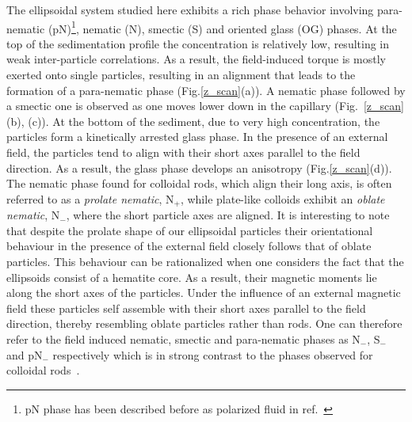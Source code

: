 \documentclass[aps,prl,preprint,superscriptaddress]{revtex4-1} %
\begin{document}
The ellipsoidal system studied here exhibits a rich phase behavior involving para-nematic (pN)\footnote{pN phase has been described before as polarized fluid in ref.~\cite{martchenko2016anisotropic}}, nematic (N), smectic (S) and oriented glass (OG) phases. At the top of the sedimentation profile the concentration is relatively low, resulting in weak inter-particle correlations. As a result, the field-induced torque is mostly exerted onto single particles, resulting in an alignment that leads to the formation of a para-nematic phase (Fig.\ref{z_scan}(a)). A nematic phase followed by a smectic one is observed as one moves lower down in the capillary (Fig.~\ref{z_scan}(b), (c)). At the bottom of the sediment, due to very high concentration, the particles form a kinetically arrested glass phase. In the presence of an external field, the particles tend to align with their short axes parallel to the field direction. As a result, the glass phase develops an anisotropy (Fig.\ref{z_scan}(d)). The nematic phase found for colloidal rods, which align their long axis, is often referred to as a \emph{prolate nematic}, N$_+$, while plate-like colloids exhibit an \emph{oblate nematic}, N$_-$, where the short particle axes are aligned. It is interesting to note that despite the prolate shape of our ellipsoidal particles their orientational behaviour in the presence of the external field closely follows that of oblate particles. This behaviour can be rationalized when one considers the fact that the ellipsoids consist of a hematite core. As a result, their magnetic moments lie along the short axes of the particles. Under the influence of an external magnetic field these particles self assemble with their short axes parallel to the field direction, thereby resembling oblate particles rather than rods. One can therefore refer to the field induced nematic, smectic and para-nematic phases as N$_-$, S$_-$ and pN$_-$ respectively which is in strong contrast to the phases observed for colloidal rods~\cite{kuijk2011synthesis}. \par
\end{document}
